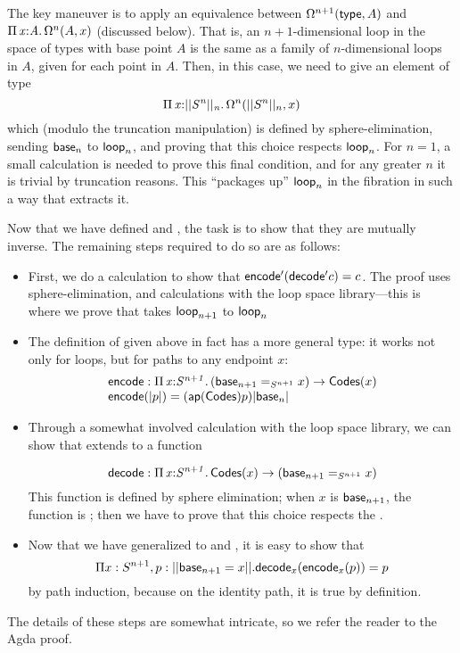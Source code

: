 The key maneuver is to apply an equivalence between
$\Omega^{n+1}(\mathsf{type},A)$ and $\textnormal{$\Pi$}\,\mathit{x} \mathit{:} \mathit{A}.\,\mathit{}{\Omega^n(A,x)}$
(discussed below).  That is,
an $n+1$-dimensional loop in the space of types with base point $A$ is
the same as a family of $n$-dimensional loops in $A$, given for each
point in $A$.  Then, in this case, we need to give an element of type
\[
\textnormal{$\Pi$}\,\mathit{x} \mathit{:} \mathit{||S^n||_n}.\,\mathit{}{\Omega^n(||S^n||_n,x)}
\]
which (modulo the truncation manipulation) is defined by
sphere-elimination, sending $\mathsf{base}_n$ to $\mathsf{loop}_n$, and
proving that this choice respects $\mathsf{loop}_n$.  For $n=1$, a small
calculation is needed to prove this final condition, and for any greater $n$
it is trivial by truncation reasons.  This ``packages up''
$\mathsf{loop}_n$ in the  fibration in such a way that
 extracts it.    

Now that we have defined  and , the task is to
show that they are mutually inverse.  The remaining steps required to do
so are as follows:
\begin{itemize}
\item First, we do a calculation to show that
  $\mathsf{encode'}(\mathsf{decode'} c) = c$.  The proof uses
  sphere-elimination, and calculations with the loop space
  library---this is where we prove that  takes
  $\mathsf{loop}_{n+1}$  to $\mathsf{loop}_n$

\item The definition of  given above in fact has a more
  general type: it works not only for loops, but for paths to any
  endpoint $x$:
\[
\begin{array}{l}
\mathsf{encode} : \textnormal{$\Pi$}\,\mathit{x} \mathit{:} \mathit{S^{n+1}}.\,\mathit{} (\mathsf{base}_{n+1} =_{S^{n+1}} x) \to \mathsf{Codes}(x)\\
\mathsf{encode}(|p|) = (\mathsf{ap}(\mathsf{Codes}) p) |\mathsf{base}_n|
\end{array}
\]

\item Through a somewhat involved calculation with the loop space library,
  we can show that  extends to a function

\[
\mathsf{decode} : \textnormal{$\Pi$}\,\mathit{x} \mathit{:} \mathit{S^{n+1}}.\,\mathit{} \mathsf{Codes}(x) \to (\mathsf{base}_{n+1} =_{S^{n+1}} x)
\]
This function is defined by sphere elimination; 
when $x$ is $\mathsf{base}_{n+1}$, the function is ; then
we have to prove that this choice respects the . 

\item Now that we have generalized to  and , it
  is easy to show that 
  \[
  \Pi x : S^{n+1}, p : || \mathsf{base}_{n+1} = x ||.  \mathsf{decode}_x(\mathsf{encode}_x(p)) = p
  \] by path
  induction, because on the identity path, it is true by definition.
\end{itemize}
%
The details of these steps are somewhat intricate, so we refer the
reader to the Agda proof.  

